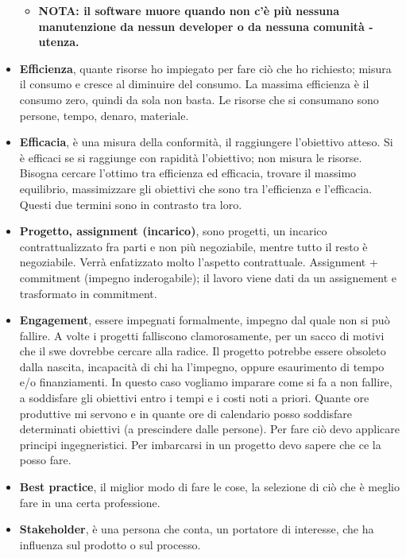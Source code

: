 \documentclass[a4paper,10pt] {article}
\begin{document}
\begin{itemize}
\begin{itemize}
\item \textbf{NOTA: il software muore quando non c'è più nessuna manutenzione
da
nessun developer o da nessuna comunità - utenza.}
	\end{itemize}

\item \textbf{Efficienza}, quante risorse ho impiegato per fare ciò che ho
richiesto; misura il consumo e cresce al diminuire
del consumo. La massima efficienza è il consumo zero, quindi da sola non basta.
Le risorse che si consumano
sono persone, tempo, denaro, materiale.

\item \textbf{Efficacia}, è una misura della conformità, il raggiungere
l'obiettivo atteso. Si è efficaci se si raggiunge con
rapidità l'obiettivo; non misura le risorse. Bisogna cercare l'ottimo tra
efficienza ed efficacia, trovare il massimo equilibrio, massimizzare gli obiettivi
che sono tra l'efficienza e l'efficacia. Questi due termini sono in contrasto tra
loro.

\item\textbf{Progetto, assignment (incarico)}, sono progetti, un incarico
contrattualizzato fra parti
e non più negoziabile, mentre tutto il resto è negoziabile. Verrà
enfatizzato molto l'aspetto
contrattuale. Assignment + commitment (impegno inderogabile); il lavoro viene dati
da un assignement
e trasformato in commitment.

\item \textbf{Engagement}, essere impegnati formalmente, impegno dal quale non si
può fallire. A volte i progetti
falliscono clamorosamente, per un sacco di motivi che il swe dovrebbe cercare alla
radice. Il progetto
potrebbe essere obsoleto dalla nascita, incapacità di chi ha l'impegno, oppure
esaurimento di tempo
e/o finanziamenti.
In questo caso vogliamo imparare come si fa a non fallire, a soddisfare gli
obiettivi entro i tempi e i costi
noti a priori. Quante ore produttive mi servono e in quante ore di calendario
posso soddisfare determinati
obiettivi (a prescindere dalle persone). Per fare ciò devo applicare principi
ingegneristici. Per imbarcarsi in
un progetto devo sapere che ce la posso fare.

\item \textbf{Best practice}, il miglior modo di fare le cose, la selezione di
ciò che è meglio fare in una certa professione.

\item \textbf{Stakeholder}, è una persona che conta, un portatore di interesse,
che ha influenza sul prodotto o sul processo.


\end{itemize}
\end{document}
